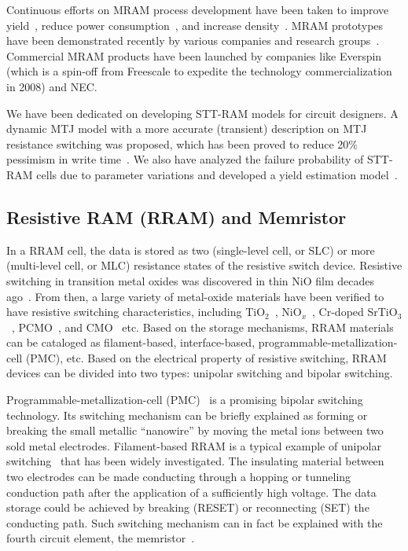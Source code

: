 Continuous efforts on MRAM process development have been taken to improve yield~\cite{Miura07}, reduce power consumption~\cite{Durlam03}, and increase density~\cite{Lou08}. MRAM prototypes have been demonstrated recently by various companies and research groups~\cite{Hosomi05,Kawahara07,Nebashi09,Motoyoshi04,Andre05,Kawahara08}. Commercial MRAM products have been launched by companies like Everspin (which is a spin-off from Freescale to expedite the technology commercialization in 2008) and NEC.

We have been dedicated on developing STT-RAM models for circuit designers. A dynamic MTJ model with a more accurate (transient) description on MTJ resistance switching was proposed, which has been proved to reduce 20\% pessimism in write time~\cite{Chen08}. We also have analyzed the failure probability of STT-RAM cells due to parameter variations and developed a yield estimation model~\cite{Li09}.

\subsection{Resistive RAM (RRAM) and Memristor}
In a RRAM cell, the data is stored as two (single-level cell, or SLC) or more (multi-level cell, or MLC) resistance states of the resistive switch device. Resistive switching in transition metal oxides was discovered in thin NiO film decades ago~\cite{Gibbons64}. From then, a large variety of metal-oxide materials have been verified to have resistive switching characteristics, including TiO$_2$~\cite{Fujimoto06}, NiO$_x$~\cite{Jung07}, Cr-doped SrTiO$_3$~\cite{Janousch07}, PCMO~\cite{Liu00}, and CMO~\cite{Hsu07} etc. Based on the storage mechanisms, RRAM materials can be cataloged as filament-based, interface-based, programmable-metallization-cell (PMC), etc. Based on the electrical property of resistive switching, RRAM devices can be divided into two types: unipolar switching and bipolar switching.

Programmable-metallization-cell (PMC)~\cite{Kozicki05} is a promising bipolar switching technology. Its switching mechanism can be briefly explained as forming or breaking the small metallic ``nanowire'' by moving the metal ions between two sold metal electrodes. Filament-based RRAM is a typical example of unipolar switching~\cite{Inoue} that has been widely investigated. The insulating material between two electrodes can be made conducting through a hopping or tunneling conduction path after the application of a sufficiently high voltage. The data storage could be achieved by breaking (RESET) or reconnecting (SET) the conducting path. Such switching mechanism can in fact be explained with the fourth circuit element, the memristor~\cite{Chua71,Tour08,Strukov08}.

